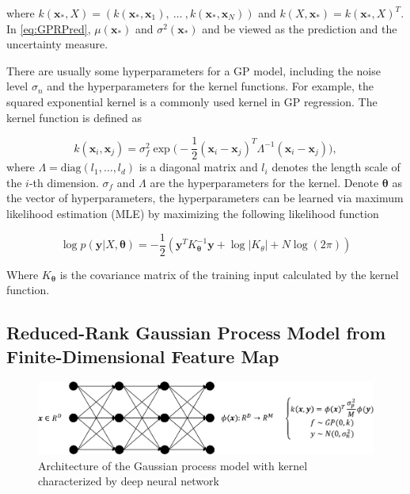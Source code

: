 where $k(\bm{x}_*, X) = (k(\bm{x}_*, \bm{x}_1),~\dots~,k(\bm{x}_*, \bm{x}_N))$ and $k(X, \bm{x}_*) = k(\bm{x}_*, X)^T$. In \eqref{eq:GPRPred}, $\mu(\bm{x}_*)$ and $\sigma^2(\bm{x}_*)$ and be viewed as the prediction and the uncertainty measure.

There are usually some hyperparameters for a GP model, including the noise level $\sigma_n$ and the hyperparameters for the kernel functions. For example, the squared exponential kernel is a commonly used kernel in GP regression. The kernel function is defined as

\begin{equation}
    \label{eq:GaussianCovarianceFunction}
    k(\bm{x}_i, \bm{x}_j) = \sigma_f^2 \exp\Big(-\frac{1}{2}(\bm{x}_i - \bm{x}_j)^T\Lambda^{-1}(\bm{x}_i - \bm{x}_j)\Big),
\end{equation}
where $\Lambda = \mathrm{diag}(l_1, \dots, l_d)$ is a diagonal matrix and $l_i$ denotes the length scale of the $i$-th dimension. $\sigma_f$ and $\Lambda$ are the hyperparameters for the kernel. Denote $\bm{\theta}$ as the vector of hyperparameters, the hyperparameters can be learned via maximum likelihood estimation (MLE) by maximizing the following likelihood function

\begin{equation}
    \label{eq:GPloglikelihood}
    \log p(\bm{y} | X, \bm{\theta}) = -\frac{1}{2}(\bm{y}^T K_{\bm{\theta}}^{-1} \bm{y} + \log |K_{\theta}| + N \log(2 \pi))
\end{equation}

Where $K_{\bm{\theta}}$ is the covariance matrix of the training input calculated by the kernel function.

\subsection{Reduced-Rank Gaussian Process Model from Finite-Dimensional Feature Map}\label{sec:NNGP}

\begin{figure}[!htb]
    \centering
    \includegraphics[width=\columnwidth]{./img/nn1.pdf}
    \caption{Architecture of the Gaussian process model with kernel characterized by deep neural network}
    \label{fig:NNGP}
\end{figure}

